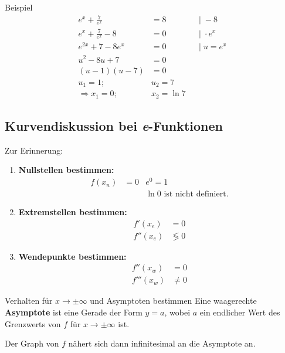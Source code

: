 \documentclass{article}
\begin{document}
\begin{boxx}[DarkBlue]{Beispiel}
    \begin{align*}
        e^x + \frac{7}{e^x} &= 8 & &|\; -8 \\
        e^x + \frac{7}{e^x} -8 &= 0 & &|\; \cdot e^x \\
        e^{2x} + 7 - 8e^x &= 0 & &|\; u = e^x \\
        u^2 - 8u + 7 &= 0 \\
        (u-1)(u-7) &= 0 \\
        u_1 = 1;\;&u_2 = 7 \\
        \Rightarrow x_1 = 0;\;&x_2 = \ln 7
    \end{align*}
\end{boxx}

\newpage

\subsection{Kurvendiskussion bei \emph{e}-Funktionen}
Zur Erinnerung:
\begin{enumerate}
    \item \textbf{Nullstellen bestimmen:}
    \begin{align*}
        f(x_n) &= 0 & e^0 =1 \\
        & & \ln 0 \text{ ist nicht definiert.} 
    \end{align*}
    \item \textbf{Extremstellen bestimmen:} 
    \begin{align*}
        f'(x_e) &= 0\\
        f''(x_e) &\lessgtr 0
    \end{align*}
    \item \textbf{Wendepunkte bestimmen:}
    \begin{align*}
        f''(x_w) &= 0\\
        f'''(x_w) &\not= 0
    \end{align*}
\end{enumerate}

\begin{boxx}[Red]{Verhalten für $x \to \pm \infty$ und Asymptoten bestimmen}
    Eine waagerechte \textbf{Asymptote} ist eine Gerade der Form $y=a$,
    wobei $a$ ein endlicher Wert des Grenzwerts von $f$ für $x \to \pm \infty$ ist.
    
    Der Graph von $f$ nähert sich dann infinitesimal an die Asymptote an.
\end{boxx}
\end{document}
